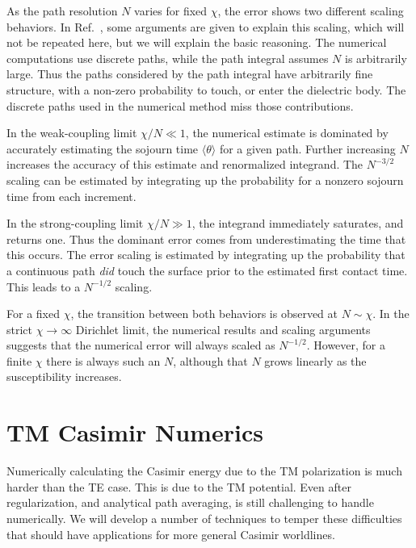 As the path resolution $N$ varies for fixed $\chi$, the error shows two different scaling behaviors.  
In Ref.~\cite{Mackrory2016}, some arguments are given to explain this scaling, which will not be repeated here,
but we will explain the basic reasoning.  The numerical computations use discrete paths, 
while the path integral assumes $N$ is arbitrarily large.  Thus the paths considered by the path integral
have arbitrarily fine structure, with a non-zero probability to touch, or enter the dielectric body.
The discrete paths used in the numerical method miss those contributions.  

In the weak-coupling limit $\chi/N\ll 1$, the numerical estimate is dominated by accurately estimating the sojourn
time $\langle\theta\rangle$ for a given path.  Further increasing $N$ increases the accuracy of this 
estimate and renormalized integrand.  The $N^{-3/2}$ scaling can be estimated by integrating up the probability for a nonzero sojourn time
from each increment.  

In the strong-coupling limit $\chi/N\gg 1$, the integrand immediately saturates, and returns one.
Thus the dominant error comes from underestimating the time that this occurs.  The error scaling
is estimated by integrating up the probability that a continuous path \emph{did} touch the surface
prior to the estimated first contact time.  This leads to a $N^{-1/2}$ scaling.

For a fixed $\chi$, the transition between both behaviors is observed at $N\sim\chi$. 
In the strict $\chi\rightarrow\infty$ Dirichlet limit, the numerical results and scaling 
arguments suggests that the numerical error will always scaled as $N^{-1/2}$.  However, for a finite
$\chi$ there is always such an $N$, although that $N$ grows linearly as the susceptibility increases.  

\section{TM Casimir Numerics}
\label{sec:TM_numerics}

Numerically calculating the Casimir energy due to the TM polarization is much harder than the TE case. 
This is due to the TM potential.
Even after regularization, and analytical path averaging, is still challenging to handle numerically.
We will develop a number of techniques to temper these difficulties that should have applications for more general Casimir worldlines.

